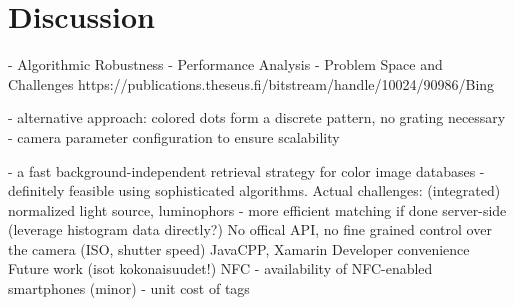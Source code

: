\documentclass[thesis.tex]{subfiles}
\begin{document}
\chapter{Discussion}
\label{chapter:discussion}

- Algorithmic Robustness
- Performance Analysis
- Problem Space and Challenges
https://publications.theseus.fi/bitstream/handle/10024/90986/Bing%




- alternative approach: colored dots form a discrete pattern, no grating necessary
- camera parameter configuration to ensure scalability

- a fast background-independent retrieval strategy for color image databases
- definitely feasible using sophisticated algorithms. Actual challenges: (integrated) normalized light source, luminophors
- more efficient matching if done server-side (leverage histogram data directly?)
No offical API, no fine grained control over the camera (ISO, shutter speed)
JavaCPP, Xamarin
Developer convenience
Future work (isot kokonaisuudet!)
NFC
- availability of NFC-enabled smartphones (minor)
- unit cost of tags
\end{document}
